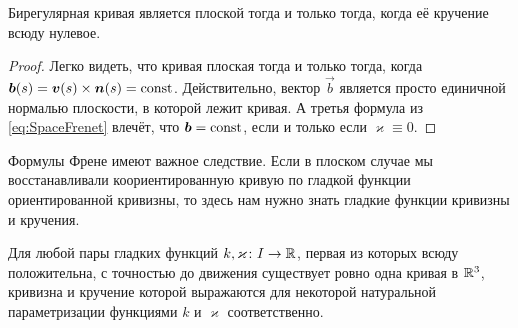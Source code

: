 \begin{proposition}
	Бирегулярная кривая является плоской тогда и только тогда, когда её кручение всюду нулевое.
\end{proposition}

\begin{proof}
	Легко видеть, что кривая плоская тогда и только тогда, когда $\vec{b}(s) \hm= \vec{v}(s) \times \vec{n}(s) = \const$. Действительно, вектор $\vec{b}$ является просто единичной нормалью плоскости, в которой лежит кривая. А третья формула из \eqref{eq:SpaceFrenet} влечёт, что $\boldsymbol{b} = \mathrm{const}$, если и только если $\varkappa \equiv 0$.
\end{proof}

Формулы Френе имеют важное следствие. Если в плоском случае мы восстанавливали коориентированную кривую по гладкой функции ориентированной кривизны, то здесь нам нужно знать гладкие функции кривизны и кручения.

\begin{theorem} \label{theorem:FundamentalSpaceCurves}
	Для любой пары гладких функций $k, \varkappa\colon I \to \mathbb{R}$, первая из которых всюду положительна, с точностью до движения существует ровно одна кривая в $\mathbb{R}^3$, кривизна и кручение которой выражаются для некоторой натуральной параметризации функциями $k$ и $\varkappa$ соответственно.
\end{theorem}

